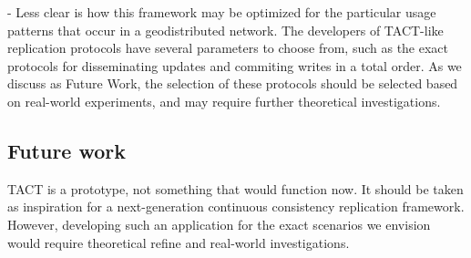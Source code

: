 - Less clear is how this framework may be optimized for the particular
  usage patterns that occur in a geodistributed network. The
  developers of TACT-like replication protocols have several
  parameters to choose from, such as the exact protocols for
  disseminating updates and commiting writes in a total order. As we
  discuss as Future Work, the selection of these protocols should be
  selected based on real-world experiments, and may require further
  theoretical investigations.

\subsection{Future work}

TACT is a prototype, not something that would function now. It should
be taken as inspiration for a next-generation continuous consistency
replication framework. However, developing such an application for the
exact scenarios we envision would require theoretical refine and
real-world investigations.

